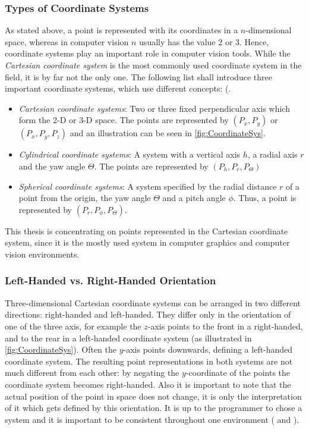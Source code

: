 \subsubsection{Types of Coordinate Systems}
As stated above, a point is represented with its coordinates in a $n$-dimensional space, whereas in computer vision $n$ usually has the value $2$ or $3$. Hence, coordinate systems play an important role in computer vision tools. While the \textit{Cartesian coordinate system} is the most commonly used coordinate system in the field, it is by far not the only one. The following list shall introduce three important coordinate systems, which use different concepts: (\cite[p.166 et seq.]{Gregory.2014}.  
\begin{itemize}
\item \textit{Cartesian coordinate systems}: Two or three fixed perpendicular axis which form the 2-D or 3-D space. The points are represented by $(P_x,P_y)$ or $(P_x,P_y,P_z)$ and an illustration can be seen in \autoref{fig:CoordinateSys}.  
\item \textit{Cylindrical coordinate systems}: A system with a vertical axis $h$, a radial axis $r$ and the yaw angle $\Theta$. The points are represented by $(P_h,P_r,P_\Theta)$
\item \textit{Spherical coordinate systems}: A system specified by the radial distance $r$ of a point from the origin, the yaw angle $\Theta$ and a pitch angle $\phi$. Thus, a point is represented by $(P_r,P_\phi,P_\Theta)$.
\end{itemize}

This thesis is concentrating on points represented in the Cartesian coordinate system, since it is the mostly used system in computer graphics and computer vision environments.

\subsubsection{Left-Handed vs. Right-Handed Orientation}
Three-dimensional Cartesian coordinate systems can be arranged in two different directions: right-handed and left-handed. They differ only in the orientation of one of the three axis, for example the $z$-axis points to the front in a right-handed, and to the rear in a left-handed coordinate system (as illustrated in \autoref{fig:CoordinateSys}). Often the $y$-axis points downwards, defining a left-handed coordinate system. The resulting point representations in both systems are not much different from each other: by negating the $y$-coordinate of the points the coordinate system becomes right-handed. Also it is important to note that the actual position of the point in space does not change, it is only the interpretation of it which gets defined by this orientation. It is up to the programmer to chose a system and it is important to be consistent throughout one environment (\cite[p.164 et seq.]{Hartley.2011} and \cite[p.167 et seq.]{Gregory.2014}). 

